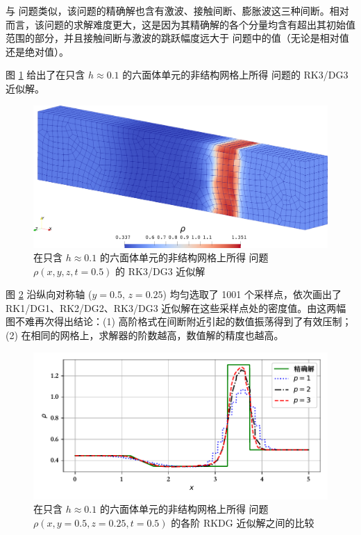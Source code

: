 与 问题类似，该问题的精确解也含有激波、接触间断、膨胀波这三种间断。相对而言，该问题的求解难度更大，这是因为其精确解的各个分量均含有超出其初始值范围的部分，并且接触间断与激波的跳跃幅度远大于
问题中的值（无论是相对值还是绝对值）。

图 \ref{fig:lax_hexa} 给出了在只含 $h\approx0.1$ 的六面体单元的非结构网格上所得 问题的
RK3/DG3 近似解。

\begin{figure}[h!]
\begin{centering}
\includegraphics[width=1\textwidth]{../mdpi/figures/shock_tubes/lax/contour}
\par\end{centering}
\caption{\label{fig:lax_hexa}在只含 $h\approx0.1$ 的六面体单元的非结构网格上所得 问题
$\rho(x,y,z,t=0.5)$ 的 RK3/DG3 近似解}
\end{figure}

图 \ref{fig:lax_hexa_p_vary} 沿纵向对称轴 ($y=0.5,\,z=0.25$) 均匀选取了 1001
个采样点，依次画出了 RK1/DG1、RK2/DG2、RK3/DG3 近似解在这些采样点处的密度值。由这两幅图不难再次得出结论：(1)
高阶格式在间断附近引起的数值振荡得到了有效压制；(2) 在相同的网格上，求解器的阶数越高，数值解的精度也越高。

\begin{figure}[h!]
\begin{centering}
\includegraphics[width=1\textwidth,height=0.3\textheight]{figures/shock_tubes/lax/result}
\par\end{centering}
\caption{\label{fig:lax_hexa_p_vary}在只含 $h\approx0.1$ 的六面体单元的非结构网格上所得 问题
$\rho(x,y=0.5,z=0.25,t=0.5)$ 的各阶 RKDG 近似解之间的比较}
\end{figure}

